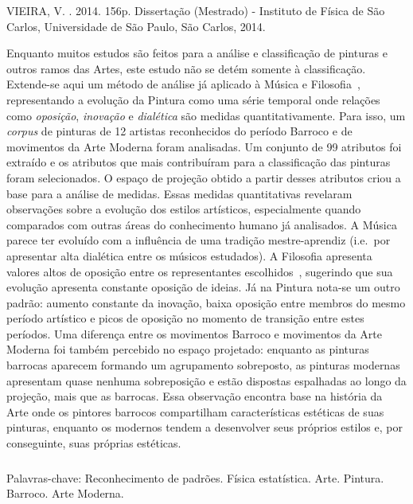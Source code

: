 \begin{resumo2}
\vspace{-10mm}
VIEIRA, V. \textbf{\ABNTtitulodata}. 2014. 156p. Dissertação (Mestrado) - Instituto de Física de São Carlos, Universidade de São Paulo, São Carlos, 2014.
\vspace{15mm}

Enquanto muitos estudos são feitos para a análise e classificação de
pinturas e outros ramos das Artes, este estudo não se detém somente à
classificação. Extende-se aqui um método de análise já aplicado à
Música e Filosofia~\cite{vieira}, representando a evolução da Pintura
como uma série temporal onde relações como \textit{oposição},
\textit{inovação} e \textit{dialética} são medidas
quantitativamente. Para isso, um \textit{corpus} de pinturas de 12
artistas reconhecidos do período Barroco e de movimentos da Arte
Moderna foram analisadas. Um conjunto de 99 atributos foi extraído e
os atributos que mais contribuíram para a classificação das pinturas
foram selecionados. O espaço de projeção obtido a partir desses
atributos criou a base para a análise de medidas. Essas medidas
quantitativas revelaram observações sobre a evolução dos estilos
artísticos, especialmente quando comparados com outras áreas do
conhecimento humano já analisados. A Música parece ter evoluído com a
influência de uma tradição mestre-aprendiz (i.e.\ por apresentar alta
dialética entre os músicos estudados). A Filosofia apresenta valores
altos de oposição entre os representantes escolhidos~\cite{vieira},
sugerindo que sua evolução apresenta constante oposição de ideias. Já
na Pintura nota-se um outro padrão: aumento constante da inovação,
baixa oposição entre membros do mesmo período artístico e picos de
oposição no momento de transição entre estes períodos. Uma diferença
entre os movimentos Barroco e movimentos da Arte Moderna foi também
percebido no espaço projetado: enquanto as pinturas barrocas aparecem
formando um agrupamento sobreposto, as pinturas modernas apresentam
quase nenhuma sobreposição e estão dispostas espalhadas ao longo da
projeção, mais que as barrocas. Essa observação encontra base na
história da Arte onde os pintores barrocos compartilham
características estéticas de suas pinturas, enquanto os modernos
tendem a desenvolver seus próprios estilos e, por conseguinte, suas
próprias estéticas.

$\phantom{linha em branco}$\\ Palavras-chave: Reconhecimento de
padrões. Física estatística. Arte. Pintura. Barroco. Arte
Moderna. 

\end{resumo2}


